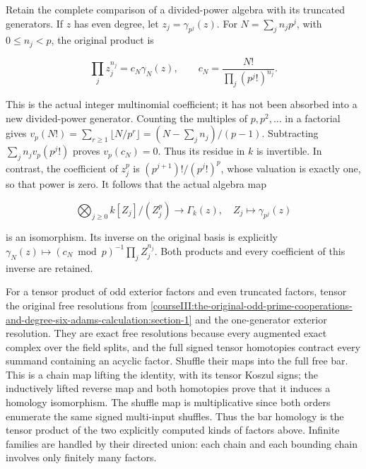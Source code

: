 Retain the complete comparison of a divided-power algebra with its truncated generators. If \(z\) has even degree, let \(z_j=\gamma_{p^j}(z)\). For \(N=\sum_j n_jp^j\), with \(0\leq n_j<p\), the original product is

\begin{equation}
\prod_j z_j^{n_j}
 =c_N\gamma_N(z),\qquad
 c_N=\frac{N!}{\prod_j(p^j!)^{n_j}}.
 \label{courseIII:the-original-odd-prime-cooperations-and-degree-six-adams-calculation:eq:3.1}
\end{equation}

This is the actual integer multinomial coefficient; it has not been absorbed into a new divided-power generator. Counting the multiples of \(p,p^2,\ldots\) in a factorial gives
\(v_p(N!)=\sum_{r\geq1}\lfloor N/p^r\rfloor=(N-\sum_j n_j)/(p-1)\). Subtracting \(\sum_j n_jv_p(p^j!)\) proves \(v_p(c_N)=0\). Thus its residue in \(k\) is invertible. In contrast, the coefficient of \(z_j^p\) is \((p^{j+1})!/(p^j!)^p\), whose valuation is exactly one, so that power is zero. It follows that the actual algebra map

\begin{equation}
\bigotimes_{j\geq0}k[Z_j]/(Z_j^p)\longrightarrow\Gamma_k(z),
 \quad Z_j\longmapsto\gamma_{p^j}(z)
 \label{courseIII:the-original-odd-prime-cooperations-and-degree-six-adams-calculation:eq:3.2}
\end{equation}

is an isomorphism. Its inverse on the original basis is explicitly
\(\gamma_N(z)\mapsto(c_N\bmod p)^{-1}\prod_jZ_j^{n_j}\). Both products and every coefficient of this inverse are retained.

For a tensor product of odd exterior factors and even truncated factors, tensor the original free resolutions from \cref{courseIII:the-original-odd-prime-cooperations-and-degree-six-adams-calculation:section-1} and the one-generator exterior resolution. They are exact free resolutions because every augmented exact complex over the field splits, and the full signed tensor homotopies contract every summand containing an acyclic factor. Shuffle their maps into the full free bar. This is a chain map lifting the identity, with its tensor Koszul signs; the inductively lifted reverse map and both homotopies prove that it induces a homology isomorphism. The shuffle map is multiplicative since both orders enumerate the same signed multi-input shuffles. Thus the bar homology is the tensor product of the two explicitly computed kinds of factors above. Infinite families are handled by their directed union: each chain and each bounding chain involves only finitely many factors.

